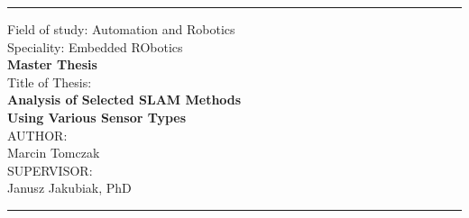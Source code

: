 \hypersetup{pageanchor=false}
\begin{titlepage}
\thispagestyle{empty}
\singlespacing
\setlength{\parskip}{0pt}

\noindent{}

\vspace{0.3cm}
\noindent\rule{\linewidth}{0.6pt}
\vspace{0.8cm}

\begin{center}
{\normalsize Field of study: Automation and Robotics}\\[0.15cm]
{\normalsize Speciality: Embedded RObotics}\\[2.0cm]
{\fontsize{24}{28}\selectfont\textbf{Master Thesis}}\\[2.5cm]
{\normalsize Title of Thesis:}\\[0.4cm]
{\large\textbf{Analysis of Selected SLAM Methods \\
 Using Various Sensor Types}}\\[2.8cm]
{\normalsize AUTHOR:}\\[0.4cm]
{\normalsize Marcin Tomczak}\\[1.2cm]
{\normalsize SUPERVISOR:}\\[0.4cm]
{\normalsize Janusz Jakubiak, PhD}
\end{center}

\vfill

\noindent\rule{\linewidth}{0.6pt}
\vspace{0.2cm}

{\setlength{\fboxrule}{0.3pt}%
\noindent\fbox{%
  \begin{minipage}{\dimexpr\linewidth-2\fboxsep-2\fboxrule}
    \centering
    \vspace{0.2cm}
    {\normalsize WROCŁAW \the\year}
    \vspace{0.2cm}
  \end{minipage}%
}}

\restoregeometry
\end{titlepage}
\hypersetup{pageanchor=true}
